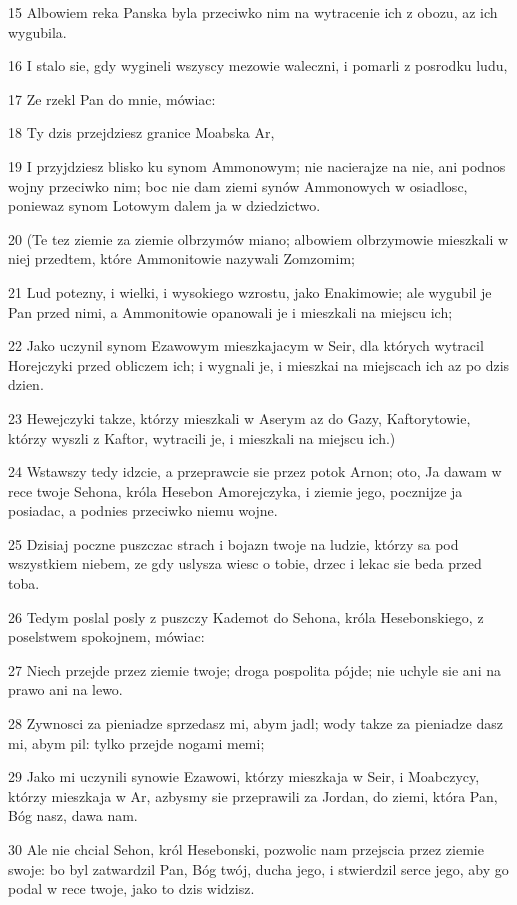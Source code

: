 \par 15 Albowiem reka Panska byla przeciwko nim na wytracenie ich z obozu, az ich wygubila.
\par 16 I stalo sie, gdy wygineli wszyscy mezowie waleczni, i pomarli z posrodku ludu,
\par 17 Ze rzekl Pan do mnie, mówiac:
\par 18 Ty dzis przejdziesz granice Moabska Ar,
\par 19 I przyjdziesz blisko ku synom Ammonowym; nie nacierajze na nie, ani podnos wojny przeciwko nim; boc nie dam ziemi synów Ammonowych w osiadlosc, poniewaz synom Lotowym dalem ja w dziedzictwo.
\par 20 (Te tez ziemie za ziemie olbrzymów miano; albowiem olbrzymowie mieszkali w niej przedtem, które Ammonitowie nazywali Zomzomim;
\par 21 Lud potezny, i wielki, i wysokiego wzrostu, jako Enakimowie; ale wygubil je Pan przed nimi, a Ammonitowie opanowali je i mieszkali na miejscu ich;
\par 22 Jako uczynil synom Ezawowym mieszkajacym w Seir, dla których wytracil Horejczyki przed obliczem ich; i wygnali je, i mieszkai na miejscach ich az po dzis dzien.
\par 23 Hewejczyki takze, którzy mieszkali w Aserym az do Gazy, Kaftorytowie, którzy wyszli z Kaftor, wytracili je, i mieszkali na miejscu ich.)
\par 24 Wstawszy tedy idzcie, a przeprawcie sie przez potok Arnon; oto, Ja dawam w rece twoje Sehona, króla Hesebon Amorejczyka, i ziemie jego, pocznijze ja posiadac, a podnies przeciwko niemu wojne.
\par 25 Dzisiaj poczne puszczac strach i bojazn twoje na ludzie, którzy sa pod wszystkiem niebem, ze gdy uslysza wiesc o tobie, drzec i lekac sie beda przed toba.
\par 26 Tedym poslal posly z puszczy Kademot do Sehona, króla Hesebonskiego, z poselstwem spokojnem, mówiac:
\par 27 Niech przejde przez ziemie twoje; droga pospolita pójde; nie uchyle sie ani na prawo ani na lewo.
\par 28 Zywnosci za pieniadze sprzedasz mi, abym jadl; wody takze za pieniadze dasz mi, abym pil: tylko przejde nogami memi;
\par 29 Jako mi uczynili synowie Ezawowi, którzy mieszkaja w Seir, i Moabczycy, którzy mieszkaja w Ar, azbysmy sie przeprawili za Jordan, do ziemi, która Pan, Bóg nasz, dawa nam.
\par 30 Ale nie chcial Sehon, król Hesebonski, pozwolic nam przejscia przez ziemie swoje: bo byl zatwardzil Pan, Bóg twój, ducha jego, i stwierdzil serce jego, aby go podal w rece twoje, jako to dzis widzisz.
